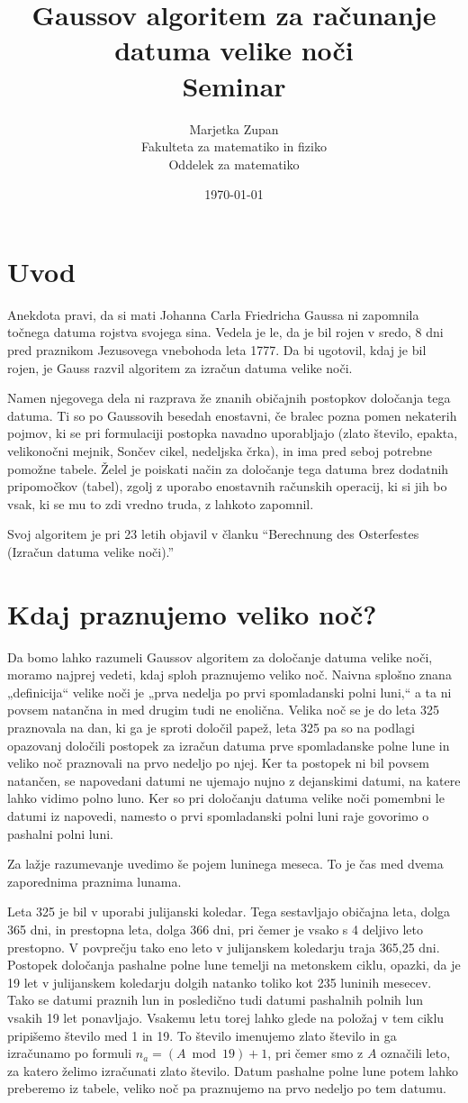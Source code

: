 \documentclass[a4paper,12pt]{article}
\title{Gaussov algoritem za računanje datuma velike noči \\ 
\Large Seminar}
\author{Marjetka Zupan \\
Fakulteta za matematiko in fiziko \\
Oddelek za matematiko}
\date{\today}
\begin{document}
\section*{Uvod}
Anekdota pravi, da si mati Johanna Carla Friedricha Gaussa ni zapomnila 
točnega datuma rojstva svojega sina. Vedela je le, da je bil rojen v sredo, 
8 dni pred praznikom Jezusovega vnebohoda leta 1777. Da bi ugotovil, kdaj 
je bil rojen, je Gauss razvil algoritem za izračun datuma velike noči. 

Namen njegovega dela ni razprava že znanih običajnih postopkov določanja 
tega datuma. Ti so po Gaussovih besedah enostavni, če bralec pozna pomen 
nekaterih pojmov, ki se pri formulaciji postopka navadno uporabljajo (zlato 
število, epakta, velikonočni mejnik, Sončev cikel, nedeljska črka), in ima 
pred seboj potrebne pomožne tabele. Želel je poiskati način za določanje 
tega datuma brez dodatnih pripomočkov (tabel), zgolj z uporabo enostavnih 
računskih operacij, ki si jih bo vsak, ki se mu to zdi vredno truda, z 
lahkoto zapomnil.

Svoj algoritem je pri 23 letih objavil v članku ``Berechnung des Osterfestes 
(Izračun datuma velike noči).''


\section*{Kdaj praznujemo veliko noč?}

Da bomo lahko razumeli Gaussov algoritem za določanje datuma velike noči, 
moramo najprej vedeti, kdaj sploh praznujemo veliko noč. Naivna splošno znana 
„definicija“ velike noči je „prva nedelja po prvi spomladanski polni luni,“ a 
ta ni povsem natančna in med drugim tudi ne enolična.
Velika noč se je do leta 325 praznovala na dan, ki ga je sproti določil papež, 
leta 325 pa so na podlagi opazovanj določili postopek za izračun datuma prve 
spomladanske polne lune in veliko noč praznovali na prvo nedeljo po njej. Ker 
ta postopek ni bil povsem natančen, se napovedani datumi ne ujemajo nujno z 
dejanskimi datumi, na katere lahko vidimo polno luno. Ker so pri določanju 
datuma velike noči pomembni le datumi iz napovedi, namesto o prvi spomladanski 
polni luni raje govorimo o pashalni polni luni.

Za lažje razumevanje uvedimo še pojem luninega meseca. To je čas med dvema 
zaporednima praznima lunama.

Leta 325 je bil v uporabi julijanski koledar. Tega sestavljajo običajna leta, 
dolga 365 dni, in prestopna leta, dolga 366 dni, pri čemer je vsako s 4 
deljivo leto prestopno. V povprečju tako eno leto v julijanskem koledarju 
traja 365,25 dni. Postopek določanja pashalne polne lune temelji na metonskem 
ciklu, opazki, da je 19 let v julijanskem koledarju dolgih natanko toliko kot 
235 luninih mesecev. Tako se datumi praznih lun in posledično tudi datumi 
pashalnih polnih lun vsakih 19 let ponavljajo. Vsakemu letu torej lahko glede 
na položaj v tem ciklu pripišemo število med 1 in 19. To število imenujemo 
zlato število in ga izračunamo po formuli $n_a = (A \bmod 19) + 1$, pri čemer 
smo z $A$ označili leto, za katero želimo izračunati zlato število. Datum 
pashalne polne lune potem lahko preberemo iz tabele, veliko noč pa praznujemo 
na prvo nedeljo po tem datumu.
\end{document}
